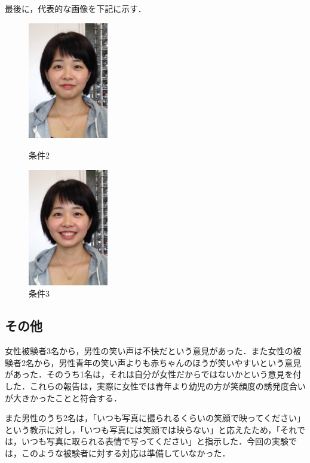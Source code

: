 \documentclass[submit,techreq]{ec2014}
\begin{document}
最後に，代表的な画像を下記に示す．

\begin{figure}[h]
\begin{minipage}{0.49\columnwidth}
\begin{center}
\includegraphics[width=35mm, bb=0 0 572 834]{images/cap_28.jpg}
\caption{条件2}
\end{center}
\end{minipage}
\begin{minipage}{0.49\columnwidth}
\begin{center}
\includegraphics[width=35mm, bb=0 0 572 834]{images/cap_123.jpg}
\caption{条件3}
\end{center}
\end{minipage}
\end{figure}


\subsection{その他}

女性被験者3名から，男性の笑い声は不快だという意見があった．また女性の被験者2名から，男性青年の笑い声よりも赤ちゃんのほうが笑いやすいという意見があった．そのうち1名は，それは自分が女性だからではないかという意見を付した．これらの報告は，実際に女性では青年より幼児の方が笑顔度の誘発度合いが大きかったことと符合する．

また男性のうち2名は，「いつも写真に撮られるくらいの笑顔で映ってください」という教示に対し，「いつも写真には笑顔では映らない」と応えたため，「それでは，いつも写真に取られる表情で写ってください」と指示した．今回の実験では，このような被験者に対する対応は準備していなかった．
\end{document}

